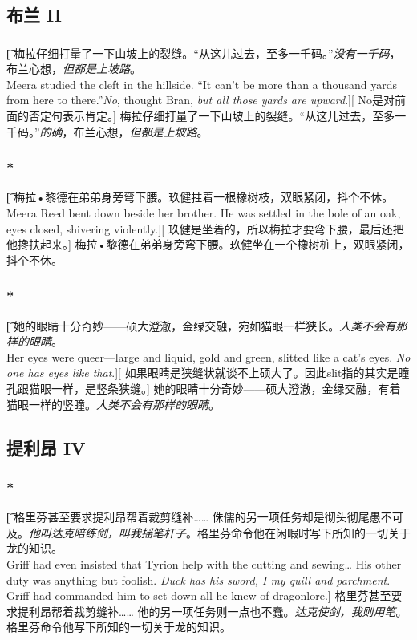 \documentclass[12pt,a4paper]{article}
\begin{document}
\subsection{布兰 II}
\subsubsection{}\t[
	梅拉仔细打量了一下山坡上的裂缝。“从这儿过去，至多一千码。”\emph{没有一千码}，布兰心想，\emph{但都是上坡路}。\\
	Meera studied the cleft in the hillside. “It can't be more than a thousand yards from here to there.”\emph{No}, thought Bran, \emph{but all those yards are upward}.][
	No是对前面的否定句表示肯定。]
	梅拉仔细打量了一下山坡上的裂缝。“从这儿过去，至多一千码。”\emph{的确}，布兰心想，\emph{但都是上坡路}。
	
\subsubsection{\color{red}*}\t[
	梅拉•黎德在弟弟身旁弯下腰。玖健拄着一根橡树枝，双眼紧闭，抖个不休。\\
	Meera Reed bent down beside her brother. He was settled in the bole of an oak, eyes closed, shivering violently.][
	玖健是坐着的，所以梅拉才要弯下腰，最后还把他搀扶起来。]
	梅拉•黎德在弟弟身旁弯下腰。玖健坐在一个橡树桩上，双眼紧闭，抖个不休。
	
\subsubsection{\color{red}*}\t[
	她的眼睛十分奇妙——硕大澄澈，金绿交融，宛如猫眼一样狭长。\emph{人类不会有那样的眼睛}。\\
	Her eyes were queer—large and liquid, gold and green, slitted like a cat's eyes. \emph{No one has eyes like that}.][
	如果眼睛是狭缝状就谈不上硕大了。因此slit指的其实是瞳孔跟猫眼一样，是竖条狭缝。]
	她的眼睛十分奇妙——硕大澄澈，金绿交融，有着猫眼一样的竖瞳。\emph{人类不会有那样的眼睛}。
	
\subsection{提利昂 IV}
\subsubsection{\color{red}*}\t[
	格里芬甚至要求提利昂帮着裁剪缝补……
	侏儒的另一项任务却是彻头彻尾愚不可及。\emph{他叫达克陪练剑，叫我摇笔杆子}。格里芬命令他在闲暇时写下所知的一切关于龙的知识。\\
	Griff had even insisted that Tyrion help with the cutting and sewing\ldots
	His other duty was anything but foolish. \emph{Duck has his sword, I my quill and parchment}. Griff had commanded him to set down all he knew of dragonlore.]
	格里芬甚至要求提利昂帮着裁剪缝补……
	他的另一项任务则一点也不蠢。\emph{达克使剑，我则用笔}。格里芬命令他写下所知的一切关于龙的知识。
\end{document}
